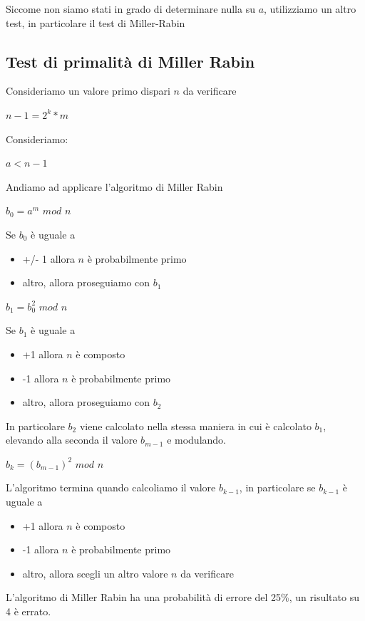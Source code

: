 \documentclass[11pt, oneside]{article}   	%
\begin{document}
Siccome non siamo stati in grado di determinare nulla su $a$, utilizziamo un altro test, in particolare 
il test di Miller-Rabin
\subsection*{Test di primalità di Miller Rabin}
Consideriamo un valore primo dispari $n$ da verificare
\begin{center}
$n-1 = 2^k * m$
\end{center}
Consideriamo: 
\begin{center}
$a < n-1$\\
\end{center}
Andiamo ad applicare l'algoritmo di Miller Rabin
\begin{center}
$b_0 = a^m$ $mod$ $n$
\end{center}
Se $b_0$ è uguale a \begin{itemize}
\item +/- 1 allora $n$ è probabilmente primo
\item altro, allora proseguiamo con $b_1$
\end{itemize}
\begin{center}
$b_1 = b^2_0$ $mod$ $n$
\end{center}
Se $b_1$ è uguale a \begin{itemize}
\item +1 allora $n$ è composto
\item -1 allora $n$ è probabilmente primo
\item altro, allora proseguiamo con $b_2$
\end{itemize}
In particolare $b_2$ viene calcolato nella stessa maniera in cui è calcolato $b_1$, elevando alla seconda il valore $b_{m-1}$ e modulando.\begin{center}
$b_k = (b_{m-1})^2$ $mod$ $n$
\end{center}
L'algoritmo termina quando calcoliamo il valore $b_{k-1}$, in particolare se $b_{k-1}$ è uguale a \begin{itemize}
\item +1 allora $n$ è composto
\item -1 allora $n$ è probabilmente primo
\item altro, allora scegli un altro valore $n$ da verificare
\end{itemize}
L'algoritmo di Miller Rabin ha una probabilità di errore del 25\%, un risultato su 4 è errato. 
\end{document}

